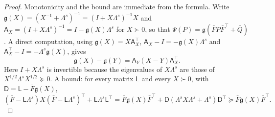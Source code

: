 \begin{proof}
Monotonicity and the bound are immediate from the formula. Write $\mathfrak g(X)=(X^{-1}+\Lambda^s)^{-1}=(I+X\Lambda^s)^{-1}X$ and $\mathsf A_X=(I+X\Lambda^s)^{-1}=I-\mathfrak g(X)\Lambda^s$ for $X\succ0$, so that $\Psi(P)=\mathfrak g(\bar FP\bar F^\top+\bar Q)$. A direct computation, using $\mathfrak g(X)=X\mathsf A_X^\top$, $\mathsf A_X-I=-\mathfrak g(X)\Lambda^s$ and $\mathsf A_X^\top-I=-\Lambda^s\mathfrak g(X)$, gives
\[
\mathfrak g(X)-\mathfrak g(Y)=\mathsf A_Y(X-Y)\mathsf A_X^\top.
\]
Here $I+X\Lambda^s$ is invertible because the eigenvalues of $X\Lambda^s$ are those of $X^{1/2}\Lambda^sX^{1/2}\succeq0$. A bound: for every matrix $\mathsf L$ and every $X\succ0$, with $\mathsf D=\mathsf L-\bar F\mathfrak g(X)$,
\[
(\bar F-\mathsf L\Lambda^s)X(\bar F-\mathsf L\Lambda^s)^\top+\mathsf L\Lambda^s\mathsf L^\top=\bar F\mathfrak g(X)\bar F^\top+\mathsf D(\Lambda^sX\Lambda^s+\Lambda^s)\mathsf D^\top\succeq\bar F\mathfrak g(X)\bar F^\top.
\]

\end{proof}
